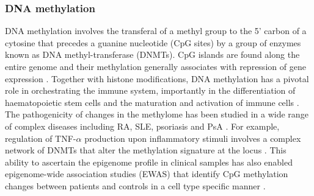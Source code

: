 \subsubsection{DNA methylation}
DNA methylation involves the transferal of a methyl group to the 5' carbon of a cytosine that precedes a guanine nucleotide (CpG sites) by a group of enzymes known as DNA methyl-transferase (DNMTs). CpG islands are found along the entire genome and their methylation generally associates with repression of gene expression \parencite{Herman2003}. Together with histone modifications, DNA methylation has a pivotal role in orchestrating the immune system, importantly in the differentiation of haematopoietic stem cells and the maturation and activation of immune cells \parencite{Sellars2015,Lai2013}. 
The pathogenicity of changes in the methylome has been studied in a wide range of complex diseases including RA, SLE, psoriasis and PsA \parencite{Lei2009,Liu2013,Zhang2010}. For example, regulation of TNF-$\alpha$ production upon inflammatory stimuli involves a complex network of DNMTs that alter the methylation signature at the locus \parencite{Sullivan2007}. %
This ability to ascertain the epigenome profile in clinical samples has also enabled epigenome-wide association studies (EWAS) that identify CpG methylation changes between patients and controls in a cell type specific manner \parencite{Zhou2016}.


